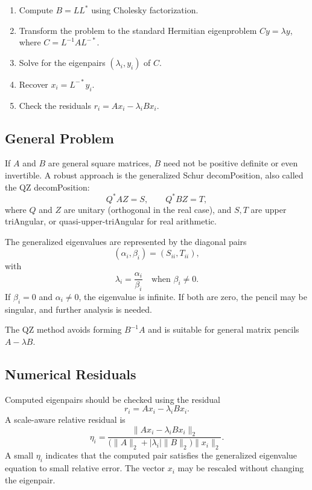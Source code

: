 \documentclass[a4paper, 10pt, onepage]{elegantbook}
\begin{document}
{\noindent

\begin{enumerate}
  \item Compute \(B=LL^*\) using Cholesky factorization.
  \item Transform the problem to the standard Hermitian eigenproblem
        \(Cy=\lambda y\), where \(C=L^{-1}AL^{-*}\).
  \item Solve for the eigenpairs \((\lambda_i,y_i)\) of \(C\).
  \item Recover \(x_i=L^{-*}y_i\).
  \item Check the residuals \(r_i=Ax_i-\lambda_iBx_i\).
\end{enumerate}

\subsection{General Problem}

\noindent

If \(A\) and \(B\) are general square matrices, \(B\) need not be
positive definite or even invertible. A robust approach is the
generalized Schur decomPosition, also called the QZ decomPosition:
\[
Q^*AZ=S,\qquad Q^*BZ=T,
\]
where \(Q\) and \(Z\) are unitary (orthogonal in the real case), and
\(S,T\) are upper triAngular, or quasi-upper-triAngular for real
arithmetic.

The generalized eigenvalues are represented by the diagonal pairs
\[
(\alpha_i,\beta_i)=(S_{ii},T_{ii}),
\]
with
\[
\lambda_i=\frac{\alpha_i}{\beta_i}
\quad\text{when }\beta_i\ne 0.
\]
If \(\beta_i=0\) and \(\alpha_i\ne0\), the eigenvalue is infinite. If
both are zero, the pencil may be singular, and further analysis is
needed.

The QZ method avoids forming \(B^{-1}A\) and is suitable for general
matrix pencils \(A-\lambda B\).

\subsection{Numerical Residuals}

\noindent

Computed eigenpairs should be checked using the residual
\[
r_i=Ax_i-\lambda_iBx_i.
\]
A scale-aware relative residual is
\[
\eta_i=
\frac{\|Ax_i-\lambda_iBx_i\|_2}
{\bigl(\|A\|_2+|\lambda_i|\|B\|_2\bigr)\|x_i\|_2}.
\]
A small \(\eta_i\) indicates that the computed pair satisfies the
generalized eigenvalue equation to small relative error. The vector
\(x_i\) may be rescaled without changing the eigenpair.

}
\end{document}
